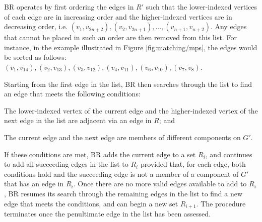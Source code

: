 \documentclass[oribibl]{llncs}
\begin{document}
BR operates by first ordering the edges in $R'$ such that the lower-indexed vertices of each edge are in increasing order and the higher-indexed vertices are in decreasing order, i.e. $(v_1, v_{2n+2}), (v_2, v_{2n+1}), ..., (v_{n+1}, v_{n+2})$. Any edges that cannot be placed in such an order are then removed from this list. For instance, in the example illustrated in Figure \ref{fig:matching/mps}, the edges would be sorted as follows: $(v_1, v_{14}), (v_2, v_{13}),(v_3, v_{12}),(v_4, v_{11}),(v_6, v_{10}),(v_7, v_8)$.

Starting from the first edge in the list, BR then searches through the list to find an edge that meets the following conditions: 
\begin{enumerate*}[label={(\alph*)}]
	\item The lower-indexed vertex of the current edge and the higher-indexed vertex of the next edge in the list are adjacent via an edge in $R$; and
	\item The current edge and the next edge are members of different components on $G'$.
\end{enumerate*}
If these conditions are met, BR adds the current edge to a set $R_i$, and continues to add all succeeding edges in the list to $R_i$ provided that, for each edge, both conditions hold and the succeeding edge is not a member of a component of $G'$ that has an edge in $R_i$. Once there are no more valid edges available to add to $R_i$, BR resumes its search through the remaining edges in the list to find a new edge that meets the conditions, and can begin a new set $R_{i+1}$. The procedure terminates once the penultimate edge in the list has been assessed.
\end{document}
